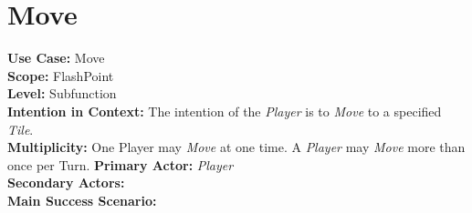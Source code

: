 \documentclass{article}
\begin{document}
	\section*{Move}
	\textbf{Use Case:} Move\\
	\textbf{Scope:} FlashPoint\\
	\textbf{Level:} Subfunction\\
	\textbf{Intention in Context: } The intention of the \textit{Player} is to \textit{Move} to a specified \textit{Tile}.\\
	\textbf{Multiplicity: } One Player may \textit{Move} at one time. A \textit{Player} may \textit{Move} more than once per Turn.
	\textbf{Primary Actor:} \textit{Player} \\
	\textbf{Secondary Actors:} \\
	\textbf{Main Success Scenario:}\\
	
\end{document}
